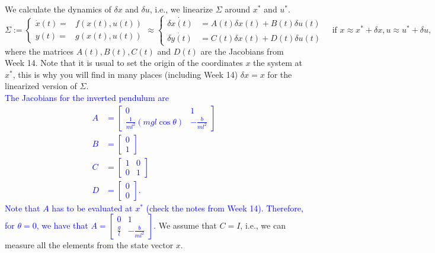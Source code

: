 We calculate the dynamics of $\delta x$ and $\delta u$, i.e., we linearize $\Sigma$ around $x^*$ and $u^*$.
\begin{equation}
	\Sigma := \begin{cases}
		\dot x(t) =& f(x(t),u(t)) \\ y(t) =& g(x(t),u(t))
	\end{cases} \approx
	\begin{cases}
		\dot {\delta x(t)} &= A(t) \delta x(t) + B(t) \delta u(t) \\
		\dot {\delta y(t)} &= C(t) \delta x(t) + D(t) \delta u(t)
	\end{cases} \quad \text{if } x\approx x^* + \delta x, u\approx u^* + \delta u, \nonumber
\end{equation}
where the matrices $A(t), B(t), C(t)$ and $D(t)$ are the Jacobians from Week 14. Note that it is usual to set the origin of the coordinates $x$ the system at $x^*$, this is why you will find in many places (including Week 14) $\delta x = x$ for the linearized version of $\Sigma$. \\
\textcolor{blue}{The Jacobians for the inverted pendulum are
\begin{align}
	A &= \begin{bmatrix}0 & 1 \\ \frac{1}{ml^2}(mgl\cos\theta) & -\frac{b}{ml^2} \end{bmatrix} \nonumber \\
		B &= \begin{bmatrix}0 \\ 1 \end{bmatrix} \nonumber \\
		C &= \begin{bmatrix}1 & 0 \\ 0 & 1\end{bmatrix} \nonumber \\
		D &= \begin{bmatrix}0 \\ 0 \end{bmatrix}.
\end{align}
Note that $A$ has to be evaluated at $x^*$ (check the notes from Week 14). Therefore, for $\theta = 0$, we have that $A = \begin{bmatrix}0 & 1 \\ \frac{g}{l} & -\frac{b}{ml^2} \end{bmatrix}$.} We assume that $C = I$, i.e., we can measure all the elements from the state vector $x$.\\

